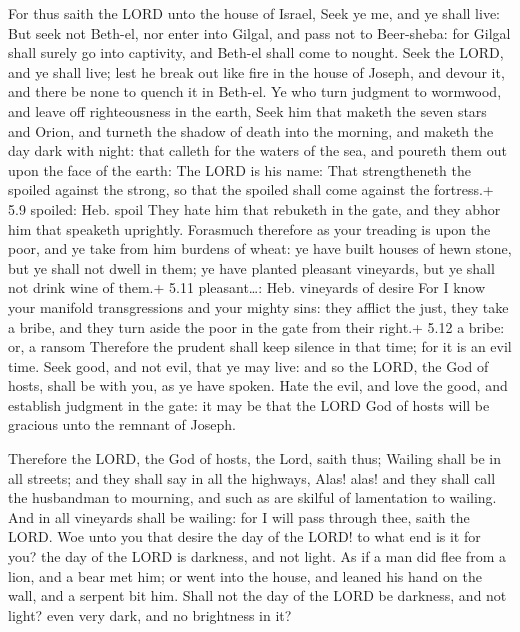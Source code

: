  For thus saith the LORD unto the house of Israel, Seek ye
me, and ye shall live:  But seek not Beth-el, nor enter into
Gilgal, and pass not to Beer-sheba: for Gilgal shall surely go into
captivity, and Beth-el shall come to nought.  Seek the LORD,
and ye shall live; lest he break out like fire in the house of Joseph,
and devour it, and there be none to quench it in Beth-el. 
Ye who turn judgment to wormwood, and leave off righteousness in the
earth,  Seek him that maketh the seven stars and Orion, and
turneth the shadow of death into the morning, and maketh the day dark
with night: that calleth for the waters of the sea, and poureth them out
upon the face of the earth: The LORD is his name:  That
strengtheneth the spoiled against the strong, so that the spoiled shall
come against the fortress.+ 5.9 spoiled: Heb. spoil  They
hate him that rebuketh in the gate, and they abhor him that speaketh
uprightly.  Forasmuch therefore as your treading is upon
the poor, and ye take from him burdens of wheat: ye have built houses of
hewn stone, but ye shall not dwell in them; ye have planted pleasant
vineyards, but ye shall not drink wine of them.+ 5.11 pleasant\ldots:
Heb. vineyards of desire  For I know your manifold
transgressions and your mighty sins: they afflict the just, they take a
bribe, and they turn aside the poor in the gate from their right.+ 5.12
a bribe: or, a ransom  Therefore the prudent shall keep
silence in that time; for it is an evil time.  Seek good,
and not evil, that ye may live: and so the LORD, the God of hosts, shall
be with you, as ye have spoken.  Hate the evil, and love
the good, and establish judgment in the gate: it may be that the LORD
God of hosts will be gracious unto the remnant of Joseph.

 Therefore the LORD, the God of hosts, the Lord, saith
thus; Wailing shall be in all streets; and they shall say in all the
highways, Alas! alas! and they shall call the husbandman to mourning,
and such as are skilful of lamentation to wailing.  And in
all vineyards shall be wailing: for I will pass through thee, saith the
LORD.  Woe unto you that desire the day of the LORD! to
what end is it for you? the day of the LORD is darkness, and not light.
 As if a man did flee from a lion, and a bear met him; or
went into the house, and leaned his hand on the wall, and a serpent bit
him.  Shall not the day of the LORD be darkness, and not
light? even very dark, and no brightness in it?

